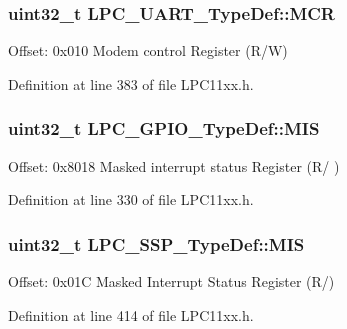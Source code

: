 \subsubsection[{\texorpdfstring{M\+CR}{MCR}}]{ uint32\+\_\+t L\+P\+C\+\_\+\+U\+A\+R\+T\+\_\+\+Type\+Def\+::\+M\+CR}\hypertarget{group___l_p_c11xx___definitions_ga6643cdb94520e1a694777499964760a3}{}\label{group___l_p_c11xx___definitions_ga6643cdb94520e1a694777499964760a3}
Offset\+: 0x010 Modem control Register (R/W) 

Definition at line 383 of file L\+P\+C11xx.\+h.

\subsubsection[{\texorpdfstring{M\+IS}{MIS}}]{ uint32\+\_\+t L\+P\+C\+\_\+\+G\+P\+I\+O\+\_\+\+Type\+Def\+::\+M\+IS}\hypertarget{group___l_p_c11xx___definitions_gaa611e60a60c7477a9b5eb5b101d8f2be}{}\label{group___l_p_c11xx___definitions_gaa611e60a60c7477a9b5eb5b101d8f2be}
Offset\+: 0x8018 Masked interrupt status Register (R/ ) 

Definition at line 330 of file L\+P\+C11xx.\+h.

\subsubsection[{\texorpdfstring{M\+IS}{MIS}}]{ uint32\+\_\+t L\+P\+C\+\_\+\+S\+S\+P\+\_\+\+Type\+Def\+::\+M\+IS}\hypertarget{group___l_p_c11xx___definitions_ga6ece7bdc39b768644e660c21c7fc7d6a}{}\label{group___l_p_c11xx___definitions_ga6ece7bdc39b768644e660c21c7fc7d6a}
Offset\+: 0x01C Masked Interrupt Status Register (R/) 

Definition at line 414 of file L\+P\+C11xx.\+h.

